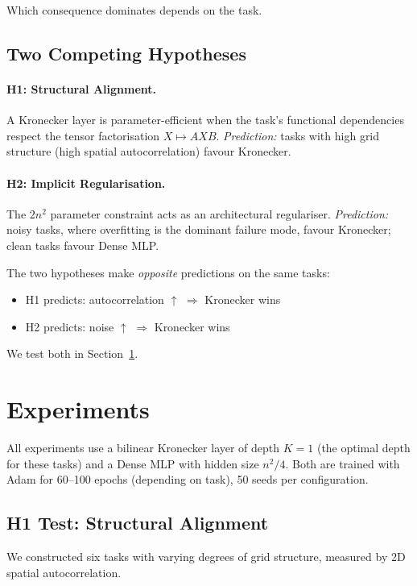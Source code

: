 \documentclass[11pt,a4paper]{article}
\begin{document}
Which consequence dominates depends on the task.

\subsection{Two Competing Hypotheses}
\label{sec:hypotheses}

\paragraph{H1: Structural Alignment.}
A Kronecker layer is parameter-efficient when the task's functional
dependencies respect the tensor factorisation $X \mapsto AXB$.
\emph{Prediction:} tasks with high grid structure (high spatial
autocorrelation) favour Kronecker.

\paragraph{H2: Implicit Regularisation.}
The $2n^2$ parameter constraint acts as an architectural
regulariser. \emph{Prediction:} noisy tasks, where overfitting is
the dominant failure mode, favour Kronecker; clean tasks favour
Dense MLP.

The two hypotheses make \emph{opposite} predictions on the same
tasks:
\begin{itemize}
\item H1 predicts: autocorrelation $\uparrow$ $\Rightarrow$
      Kronecker wins
\item H2 predicts: noise $\uparrow$ $\Rightarrow$ Kronecker wins
\end{itemize}

We test both in Section~\ref{sec:experiments}.


\section{Experiments}
\label{sec:experiments}

All experiments use a bilinear Kronecker layer of depth $K=1$
(the optimal depth for these tasks) and a Dense MLP with hidden
size $n^2/4$. Both are trained with Adam for 60--100 epochs
(depending on task), 50 seeds per configuration.

\subsection{H1 Test: Structural Alignment}
\label{sec:h1}

We constructed six tasks with varying degrees of grid structure,
measured by 2D spatial autocorrelation.
\end{document}
